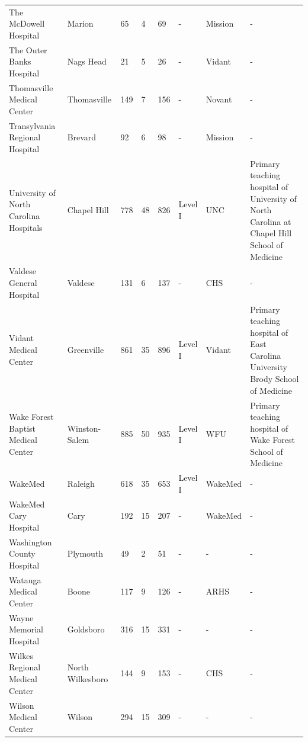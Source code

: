 \documentclass{article}
\begin{document}
\begin{tabular}{llllllll}
The McDowell Hospital & Marion & 65 & 4 & 69 & - & Mission & - \\
The Outer Banks Hospital & Nags Head & 21 & 5 & 26 & - & Vidant & - \\
Thomasville Medical Center & Thomasville & 149 & 7 & 156 & - & Novant & - \\
Transylvania Regional Hospital & Brevard & 92 & 6 & 98 & - & Mission & - \\
University of North Carolina Hospitals & Chapel Hill & 778 & 48 & 826 & Level I & UNC & Primary teaching hospital of University of North Carolina at Chapel Hill School of Medicine \\
Valdese General Hospital & Valdese & 131 & 6 & 137 & - & CHS & - \\
Vidant Medical Center & Greenville & 861 & 35 & 896 & Level I & Vidant & Primary teaching hospital of East Carolina University Brody School of Medicine \\
Wake Forest Baptist Medical Center & Winston-Salem & 885 & 50 & 935 & Level I & WFU & Primary teaching hospital of Wake Forest School of Medicine \\
WakeMed & Raleigh & 618 & 35 & 653 & Level I & WakeMed & - \\
WakeMed Cary Hospital & Cary & 192 & 15 & 207 & - & WakeMed & - \\
Washington County Hospital & Plymouth & 49 & 2 & 51 & - & - & - \\
Watauga Medical Center & Boone & 117 & 9 & 126 & - & ARHS & - \\
Wayne Memorial Hospital & Goldsboro & 316 & 15 & 331 & - & - & - \\
Wilkes Regional Medical Center & North Wilkesboro & 144 & 9 & 153 & - & CHS & - \\
Wilson Medical Center & Wilson & 294 & 15 & 309 & - & - & - \\
\bottomrule
\end{tabular}
\end{document}
